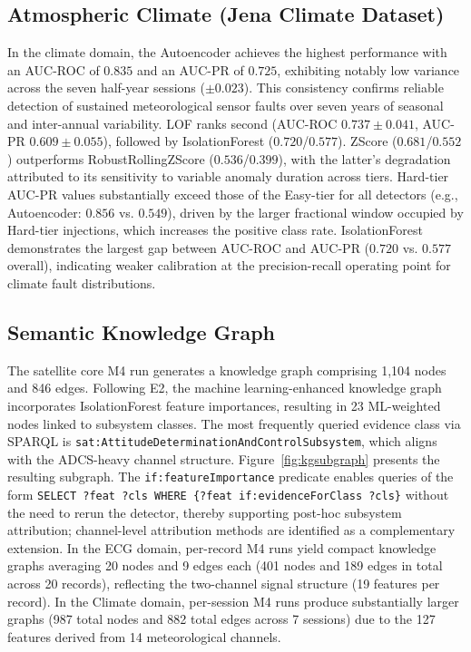 \documentclass[conference]{IEEEtran}
\begin{document}
\subsection{Atmospheric Climate (Jena Climate Dataset)}

In the climate domain, the Autoencoder achieves the highest performance with an AUC-ROC of $0.835$ and an AUC-PR of $0.725$, exhibiting notably low variance across the seven half-year sessions ($\pm 0.023$). This consistency confirms reliable detection of sustained meteorological sensor faults over seven years of seasonal and inter-annual variability. LOF ranks second (AUC-ROC $0.737 \pm 0.041$, AUC-PR $0.609 \pm 0.055$), followed by IsolationForest ($0.720$/$0.577$). ZScore ($0.681$/$0.552$) outperforms RobustRollingZScore ($0.536$/$0.399$), with the latter's degradation attributed to its sensitivity to variable anomaly duration across tiers. Hard-tier AUC-PR values substantially exceed those of the Easy-tier for all detectors (e.g., Autoencoder: $0.856$ vs. $0.549$), driven by the larger fractional window occupied by Hard-tier injections, which increases the positive class rate. IsolationForest demonstrates the largest gap between AUC-ROC and AUC-PR ($0.720$ vs. $0.577$ overall), indicating weaker calibration at the precision-recall operating point for climate fault distributions.

\subsection{Semantic Knowledge Graph}

The satellite core M4 run generates a knowledge graph comprising 1,104 nodes and 846 edges. Following E2, the machine learning-enhanced knowledge graph incorporates IsolationForest feature importances, resulting in 23 ML-weighted nodes linked to subsystem classes. The most frequently queried evidence class via SPARQL is \texttt{sat:AttitudeDeterminationAndControlSubsystem}, which aligns with the ADCS-heavy channel structure. Figure~\ref{fig:kgsubgraph} presents the resulting subgraph. The \texttt{if:featureImportance} predicate enables queries of the form \texttt{SELECT ?feat ?cls WHERE \{?feat if:evidenceForClass ?cls\}} without the need to rerun the detector, thereby supporting post-hoc subsystem attribution; channel-level attribution methods \cite{condattrib2026,multiviewae2026} are identified as a complementary extension. In the ECG domain, per-record M4 runs yield compact knowledge graphs averaging 20 nodes and 9 edges each (401 nodes and 189 edges in total across 20 records), reflecting the two-channel signal structure (19 features per record). In the Climate domain, per-session M4 runs produce substantially larger graphs (987 total nodes and 882 total edges across 7 sessions) due to the 127 features derived from 14 meteorological channels.
\end{document}
